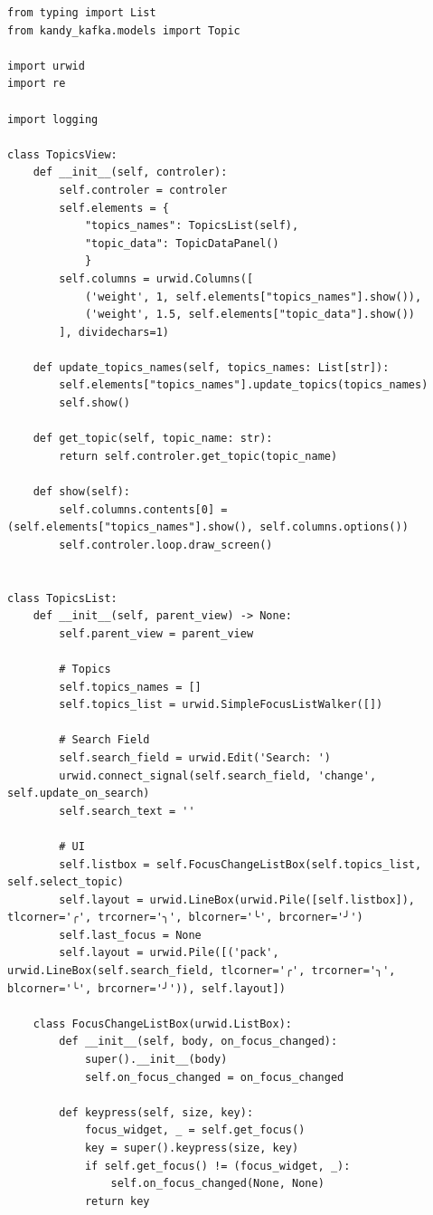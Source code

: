 \documentclass[10pt , a4paper]{report}
\newenvironment{code}{\captionsetup{type=listing}}{}
\begin{document}
\begin{code}
  \begin{verbatim}
from typing import List
from kandy_kafka.models import Topic

import urwid
import re

import logging

class TopicsView:
    def __init__(self, controler):
        self.controler = controler
        self.elements = {
            "topics_names": TopicsList(self),
            "topic_data": TopicDataPanel()
            }
        self.columns = urwid.Columns([
            ('weight', 1, self.elements["topics_names"].show()),
            ('weight', 1.5, self.elements["topic_data"].show())
        ], dividechars=1)

    def update_topics_names(self, topics_names: List[str]):
        self.elements["topics_names"].update_topics(topics_names)
        self.show()

    def get_topic(self, topic_name: str):
        return self.controler.get_topic(topic_name)
    
    def show(self):
        self.columns.contents[0] = (self.elements["topics_names"].show(), self.columns.options())
        self.controler.loop.draw_screen()


class TopicsList:
    def __init__(self, parent_view) -> None:
        self.parent_view = parent_view
        
        # Topics
        self.topics_names = []
        self.topics_list = urwid.SimpleFocusListWalker([])
        
        # Search Field
        self.search_field = urwid.Edit('Search: ')
        urwid.connect_signal(self.search_field, 'change', self.update_on_search)
        self.search_text = ''
        
        # UI
        self.listbox = self.FocusChangeListBox(self.topics_list, self.select_topic)
        self.layout = urwid.LineBox(urwid.Pile([self.listbox]), tlcorner='╭', trcorner='╮', blcorner='╰', brcorner='╯')
        self.last_focus = None
        self.layout = urwid.Pile([('pack', urwid.LineBox(self.search_field, tlcorner='╭', trcorner='╮', blcorner='╰', brcorner='╯')), self.layout])

    class FocusChangeListBox(urwid.ListBox):
        def __init__(self, body, on_focus_changed):
            super().__init__(body)
            self.on_focus_changed = on_focus_changed

        def keypress(self, size, key):
            focus_widget, _ = self.get_focus()
            key = super().keypress(size, key)
            if self.get_focus() != (focus_widget, _):
                self.on_focus_changed(None, None)
            return key
        

\end{verbatim}
\end{code}
\end{document}
